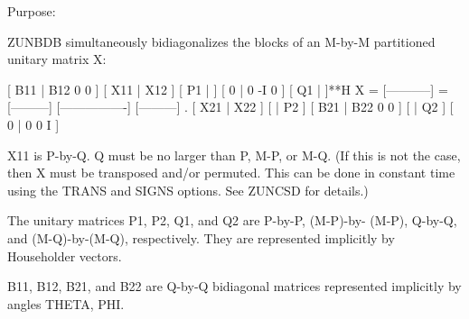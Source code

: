 \begin{DoxyParagraph}{Purpose\+: }
\begin{DoxyVerb} ZUNBDB simultaneously bidiagonalizes the blocks of an M-by-M
 partitioned unitary matrix X:

                                 [ B11 | B12 0  0 ]
     [ X11 | X12 ]   [ P1 |    ] [  0  |  0 -I  0 ] [ Q1 |    ]**H
 X = [-----------] = [---------] [----------------] [---------]   .
     [ X21 | X22 ]   [    | P2 ] [ B21 | B22 0  0 ] [    | Q2 ]
                                 [  0  |  0  0  I ]

 X11 is P-by-Q. Q must be no larger than P, M-P, or M-Q. (If this is
 not the case, then X must be transposed and/or permuted. This can be
 done in constant time using the TRANS and SIGNS options. See ZUNCSD
 for details.)

 The unitary matrices P1, P2, Q1, and Q2 are P-by-P, (M-P)-by-
 (M-P), Q-by-Q, and (M-Q)-by-(M-Q), respectively. They are
 represented implicitly by Householder vectors.

 B11, B12, B21, and B22 are Q-by-Q bidiagonal matrices represented
 implicitly by angles THETA, PHI.\end{DoxyVerb}
 
\end{DoxyParagraph}

